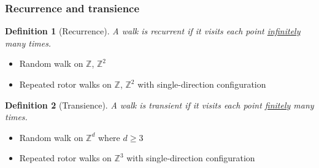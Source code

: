 \documentclass{beamer}
\newtheorem{defn}{Definition}
\begin{document}


\begin{frame}
	\frametitle{Recurrence and transience}
	\pause
	\begin{defn}[Recurrence]
		A walk is recurrent if it visits each point \underline{infinitely} many times.
	\end{defn}
	
	\pause 
	
	\begin{itemize}
		\item Random walk on $\mathbb{Z}$, $\mathbb{Z}^2$
		\item Repeated rotor walks on $\mathbb{Z}$, $\mathbb{Z}^2$ with single-direction configuration
	\end{itemize}
	
	\pause	  
	
	\begin{defn}[Transience]
		A walk is transient if it visits each point \underline{finitely} many times.
	\end{defn}
	
	\pause
	
	\begin{itemize}
		\item Random walk on $\mathbb{Z}^d$ where $d \ge 3$
		\item Repeated rotor walks on $\mathbb{Z}^3$ with single-direction configuration
	\end{itemize}
	  


	


\end{frame}
\end{document}
